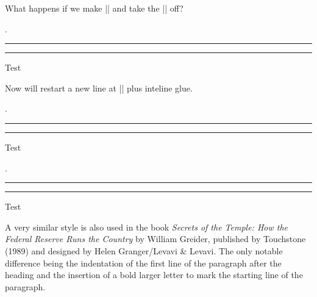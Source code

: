 What happens if we make |\vspace*{0pt}| and take the |\offinterlineskip| off? 
\begin{texexample}{}{}
\bgroup
\offinterlineskip
\par\leavevmode
\noindent
\hfill.\rule[4.25pt]{1.5cm}{1pt}\space\rule[4.25pt]{1.5cm}{1pt}\hfill\vspace*{0pt}\par
\hfill \hbox{Test}\hfill\hfill\par
\egroup
\end{texexample}

Now \tex will restart a new line at |\parskip| plus inteline glue. 

\begin{texexample}{}{}
\bgroup
\offinterlineskip
\par\leavevmode
\noindent
\hfill.\rule[4.25pt]{1.5cm}{1pt}\space\rule[4.25pt]{1.5cm}{1pt}\hfill\vspace*{0pt}\par
\egroup
\hfill \hbox{Test}\hfill\hfill\par
\end{texexample}

\begin{texexample}{}{}
\bgroup
\par\leavevmode
\noindent
\hfill.\rule[4.25pt]{1.5cm}{1pt}\space\rule[4.25pt]{1.5cm}{1pt}\hfill\vspace*{0pt}\par
\aftergroup\offinterlineskip
\egroup
\hfill \hbox{Test}\hfill\hfill\par
\end{texexample}


A very similar style is also used in the book \emph{Secrets of the Temple: How the Federal Reserve Runs the Country} by William Greider, published by Touchstone (1989) and designed by Helen Granger/Levavi \& Levavi. The only notable difference being the indentation of the first line of the paragraph after the heading and the insertion of a bold larger letter to mark the starting line of the paragraph.

